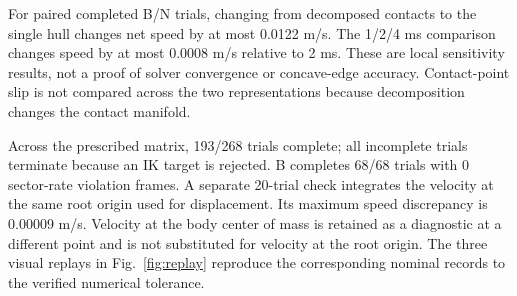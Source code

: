 For paired completed B/N trials, changing from decomposed contacts to the single hull changes net speed by at most 0.0122 m/s. The 1/2/4 ms comparison changes speed by at most 0.0008 m/s relative to 2 ms. These are local sensitivity results, not a proof of solver convergence or concave-edge accuracy. Contact-point slip is not compared across the two representations because decomposition changes the contact manifold.

Across the prescribed matrix, 193/268 trials complete; all incomplete trials terminate because an IK target is rejected. B completes 68/68 trials with 0 sector-rate violation frames. A separate 20-trial check integrates the velocity at the same root origin used for displacement. Its maximum speed discrepancy is 0.00009 m/s. Velocity at the body center of mass is retained as a diagnostic at a different point and is not substituted for velocity at the root origin. The three visual replays in Fig.~\ref{fig:replay} reproduce the corresponding nominal records to the verified numerical tolerance.
